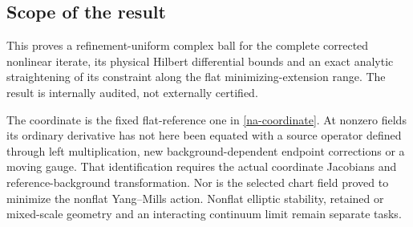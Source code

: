 \documentclass[11pt]{article}
\theoremstyle{remark}\newtheorem{remark}[theorem]{Remark}
\begin{document}
\subsection{Scope of the result}
\label{na-scope}

This proves a refinement-uniform complex ball for the complete
corrected nonlinear iterate, its physical Hilbert differential
bounds and an exact analytic straightening of its constraint along
the flat minimizing-extension range. The result is internally
audited, not externally certified.

The coordinate is the fixed flat-reference one in
\eqref{na-coordinate}. At nonzero fields its ordinary derivative
has not here been equated with a source operator defined through
left multiplication, new background-dependent endpoint corrections
or a moving gauge. That identification requires the actual
coordinate Jacobians and reference-background transformation.
Nor is the selected chart field proved to minimize the nonflat
Yang--Mills action. Nonflat elliptic stability, retained or
mixed-scale geometry and an interacting continuum limit remain
separate tasks.
\end{document}
